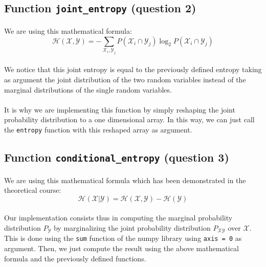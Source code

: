 \documentclass[a4paper, 11pt, oneside]{article}
\begin{document}
\subsection{Function \texttt{joint\_entropy} (question 2)}

\paragraph{}We are using this mathematical formula: 
$$ \mathcal{H}(\mathcal{X}, \mathcal{Y}) = - \sum_{\mathcal{X}_i, \mathcal{Y}_j} P(\mathcal{X}_i \cap \mathcal{Y}_j) \log_2{P(\mathcal{X}_i \cap \mathcal{Y}_j)} $$

\paragraph{}We notice that this joint entropy is equal to the previously defined entropy taking as argument the joint distribution of the two random variables instead of the marginal distributions of the single random variables.

\paragraph{}It is why we are implementing this function by simply reshaping the joint probability distribution to a one dimensional array. In this way, we can just call the \texttt{entropy} function with this reshaped array as argument.

\subsection{Function \texttt{conditional\_entropy} (question 3)}

\paragraph{}We are using this mathematical formula which has been demonstrated in the theoretical course:
$$ \mathcal{H}(\mathcal{X} | \mathcal{Y}) = \mathcal{H}(\mathcal{X} , \mathcal{Y}) - \mathcal{H}(\mathcal{Y}) $$

\paragraph{}Our implementation consists thus in computing the marginal probability distribution $P_\mathcal{Y}$ by marginalizing the joint probability distribution $P_{\mathcal{XY}}$ over $\mathcal{X}$. This is done using the \texttt{sum} function of the numpy library using \texttt{axis = 0} as argument. Then, we just compute the result using the above mathematical formula and the previously defined functions.
\end{document}
